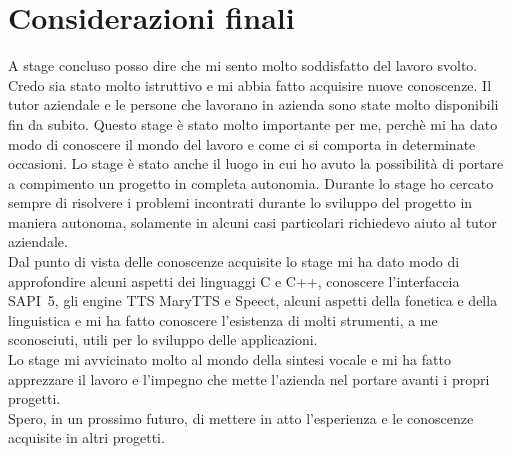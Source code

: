 \section{Considerazioni finali}
A stage concluso posso dire che mi sento molto soddisfatto del lavoro svolto. Credo sia stato molto istruttivo e mi abbia fatto acquisire nuove conoscenze.
Il tutor aziendale e le persone che lavorano in azienda sono state molto disponibili fin da subito.
Questo stage è stato molto importante per me, perchè mi ha dato modo di conoscere il mondo del lavoro e come ci si comporta in determinate occasioni.
Lo stage è stato anche il luogo in cui ho avuto la possibilità di portare a compimento un progetto in completa autonomia.
Durante lo stage ho cercato sempre di risolvere i problemi incontrati durante lo sviluppo del progetto in maniera autonoma, solamente in alcuni casi particolari richiedevo aiuto al tutor aziendale.\\
Dal punto di vista delle conoscenze acquisite lo stage mi ha dato modo di approfondire alcuni aspetti dei linguaggi C e C++, conoscere l'interfaccia SAPI~5, gli engine TTS MaryTTS e Speect, alcuni aspetti della fonetica e della linguistica e mi ha fatto conoscere l'esistenza di molti strumenti, a me sconosciuti, utili per lo sviluppo delle applicazioni.\\
Lo stage mi avvicinato molto al mondo della sintesi vocale e mi ha fatto apprezzare il lavoro e l'impegno che mette l'azienda nel portare avanti i propri progetti.\\
Spero, in un prossimo futuro, di mettere in atto l'esperienza e le conoscenze acquisite in altri progetti. 
 